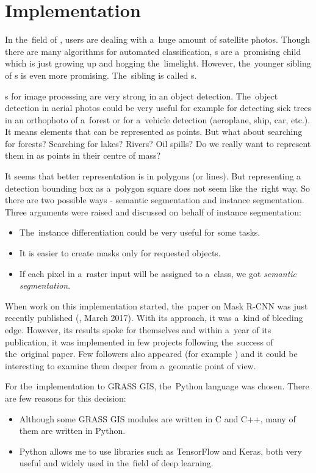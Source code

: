 \chapter{Implementation}
\label{implementation}

In the~field of , users are dealing with a~huge amount of satellite photos.
Though there are many algorithms for automated classification, s are
a~promising child which is just growing up and hogging the~limelight. However,
the~younger sibling of s is even more promising. The~sibling is called 
s.

s for image processing are very strong in an object detection.
The~object detection in aerial photos could be very useful for example for detecting 
sick trees in an orthophoto of a~forest or for a~vehicle detection (aeroplane, 
ship, car, etc.). It means elements that can be represented as points. But what 
about searching for forests? Searching for lakes? Rivers? Oil spills? Do we 
really want to represent them in  as points in their centre of mass?

It seems that better representation is in polygons (or lines). But representing
a detection bounding box as a~polygon square does not seem like the~right way. 
So there are two possible ways - semantic segmentation and instance 
segmentation. Three arguments were raised and discussed on behalf of instance 
segmentation:
\begin{itemize}
	\item The~instance differentiation could be very useful for some tasks.
	\item It is easier to create masks only for requested objects.
	\item If each pixel in a~raster input will be assigned to a~class, we got
	\textit{semantic segmentation}.
\end{itemize}

When work on this implementation started, the~paper on Mask R-CNN was just 
recently published (\cite{mask-rcnn}, March 2017). With its approach, it was
a~kind of bleeding edge. However, its results spoke for themselves and within
a~year of its publication, it was implemented in few projects following
the~success of the~original paper. Few followers also appeared (for example 
\cite{masklab}) and it could be interesting to examine them deeper from
a~geomatic point of view.

For the~implementation to GRASS GIS, the~Python language was chosen. There are
few reasons for this decision:
\begin{itemize}
	\item Although some GRASS GIS modules are written in C and C++, many of them
	are written in Python.
	\item Python allows me to use libraries such as TensorFlow and Keras, both
	very useful and widely used in the~field of deep learning. 
\end{itemize}

